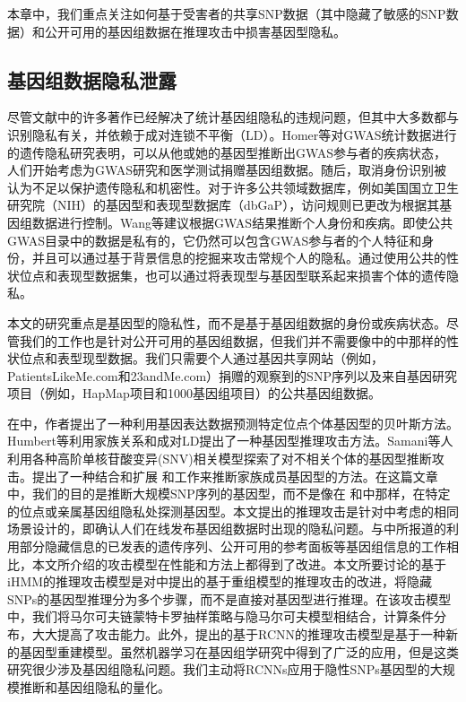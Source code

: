 本章中，我们重点关注如何基于受害者的共享SNP数据（其中隐藏了敏感的SNP数据）和公开可用的基因组数据在推理攻击中损害基因型隐私。

\subsection{基因组数据隐私泄露}

尽管文献中的许多著作已经解决了统计基因组隐私的违规问题，但其中大多数都与识别隐私有关，并依赖于成对连锁不平衡（LD）。Homer等\cite{homer2008resolving}对GWAS统计数据进行的遗传隐私研究表明，可以从他或她的基因型推断出GWAS参与者的疾病状态，人们开始考虑为GWAS研究和医学测试捐赠基因组数据。随后，取消身份识别被认为不足以保护遗传隐私和机密性。对于许多公共领域数据库，例如美国国立卫生研究院（NIH）的基因型和表现型数据库（dbGaP）\cite{mailman2007ncbi,nhgri2015privacy}，访问规则已更改为根据其基因组数据进行控制。Wang等\cite{wang2009learning}建议根据GWAS结果推断个人身份和疾病。即使公共GWAS目录中的数据是私有的，它仍然可以包含GWAS参与者的个人特征和身份，并且可以通过基于背景信息的挖掘来攻击常规个人的隐私\cite{wang2016infringement}。通过使用公共的性状位点和表现型数据集，也可以通过将表现型与基因型联系起来损害个体的遗传隐私\cite{harmanci2016quantification}。

本文的研究重点是基因型的隐私性，而不是基于基因组数据的身份\cite{wang2009learning,wang2016infringement}或疾病状态\cite{homer2008resolving,wang2009learning}。尽管我们的工作也是针对公开可用的基因组数据，但我们并不需要像\cite{wang2009learning,wang2016infringement,harmanci2016quantification}中的中那样的性状位点和表型现型数据。我们只需要个人通过基因共享网站（例如，PatientsLikeMe.com和23andMe.com）捐赠的观察到的SNP序列以及来自基因研究项目（例如，HapMap项目和1000基因组项目）的公共基因组数据。

在\cite{schadt2012bayesian}中，作者提出了一种利用基因表达数据预测特定位点个体基因型的贝叶斯方法。Humbert等\cite{humbert2013addressing}利用家族关系和成对LD提出了一种基因型推理攻击方法。Samani等人\cite{samani2015quantifying}利用各种高阶单核苷酸变异(SNV)相关模型探索了对不相关个体的基因型推断攻击。提出了一种结合和扩展\cite{humbert2013addressing} 和\cite{Deznabi_Inference_2017}工作来推断家族成员基因型的方法。在这篇文章中，我们的目的是推断大规模SNP序列的基因型，而不是像在\cite{humbert2013addressing} 和\cite{Deznabi_Inference_2017}中那样，在特定的位点\cite{schadt2012bayesian}或亲属基因组隐私处探测基因型。本文提出的推理攻击是针对\cite{samani2015quantifying}中考虑的相同场景设计的，即确认人们在线发布基因组数据时出现的隐私问题。与\cite{samani2015quantifying}中所报道的利用部分隐藏信息的已发表的遗传序列、公开可用的参考面板等基因组信息的工作相比，本文所介绍的攻击模型在性能和方法上都得到了改进。本文所要讨论的基于iHMM的推理攻击模型是对\cite{samani2015quantifying}中提出的基于重组模型的推理攻击的改进，将隐藏SNPs的基因型推理分为多个步骤，而不是直接对基因型进行推理。在该攻击模型中，我们将马尔可夫链蒙特卡罗抽样策略与隐马尔可夫模型相结合，计算条件分布，大大提高了攻击能力。此外，提出的基于RCNN的推理攻击模型是基于一种新的基因型重建模型。虽然机器学习在基因组学研究\cite{libbrecht2015machine}中得到了广泛的应用，但是这类研究很少涉及基因组隐私问题。我们主动将RCNNs应用于隐性SNPs基因型的大规模推断和基因组隐私的量化。



